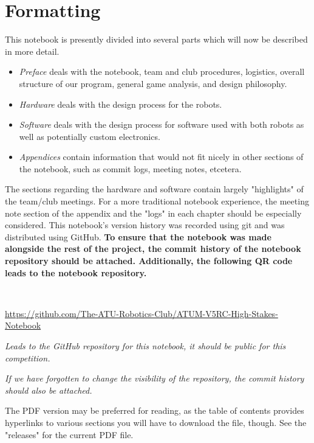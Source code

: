 \section{Formatting}
This notebook is presently divided into several parts which will now be
described in more detail.
\begin{itemize}
      \item \textit{Preface} deals with the notebook, team and club procedures,
            logistics, overall structure of our program, general game analysis,
            and design philosophy.
      \item \textit{Hardware} deals with the design process for the robots.
      \item \textit{Software} deals with the design process for software used
            with both robots as well as potentially custom electronics.
      \item \textit{Appendices} contain information that would not fit nicely in
            other sections of the notebook, such as commit logs, meeting notes,
            etcetera.
\end{itemize}
The sections regarding the hardware and software contain largely  "highlights"
of the team/club meetings. For a more traditional notebook experience, the
meeting note section of the appendix and the "logs" in each chapter should be
especially considered. This notebook's version history was recorded using git
and was distributed using GitHub. \textbf{To ensure that the notebook was made
      alongside the rest of the project, the commit history of the notebook repository
      should be attached. Additionally, the following QR code leads to the notebook
      repository.}

\pagebreak
\begin{center}
      \
      \vfill

      \vspace*{40pt}
      \url{https://github.com/The-ATU-Robotics-Club/ATUM-V5RC-High-Stakes-Notebook}

      \textit{Leads to the GitHub repository for this notebook, it should be public for this competition.}

      \textit{If we have forgotten to change the visibility of the repository, the commit history should also be attached.}

      The PDF version may be preferred for reading, as the table of contents
      provides hyperlinks to various sections you will have to download the
      file, though. See the "releases" for the current PDF file.
      \vfill
\end{center}
\pagebreak


